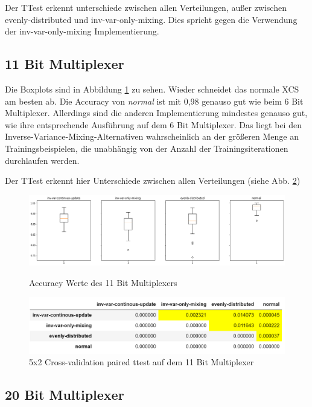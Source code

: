 \documentclass[10pt]{ocsmnar}
\begin{document}
Der TTest erkennt unterschiede zwischen allen Verteilungen, außer zwischen evenly-distributed und inv-var-only-mixing. Dies spricht gegen die Verwendung der inv-var-only-mixing Implementierung.

\subsection{11 Bit Multiplexer}

Die Boxplots sind in Abbildung \ref{boxplot-11-bit} zu sehen. Wieder schneidet das normale XCS am besten ab. Die Accuracy von \textit{normal} ist mit 0,98 genauso gut wie beim 6 Bit Multiplexer. Allerdings sind die anderen Implementierung mindestes genauso gut, wie ihre entsprechende Ausführung auf dem 6 Bit Multiplexer.  Das liegt bei den Inverse-Variance-Mixing-Alternativen wahrscheinlich an der größeren Menge an Trainingsbeispielen, die unabhängig von der Anzahl der Trainingsiterationen durchlaufen werden. 

Der TTest erkennt hier Unterschiede zwischen allen Verteilungen (siehe Abb. \ref{ttest-11-bit})

\begin{figure}[h]
    \includegraphics[width=\linewidth]{img/boxplot_11_bit.png}
    \caption{Accuracy Werte des 11 Bit Multiplexers}\label{boxplot-11-bit}
    \label{boxplot-11-bit}
\end{figure}

\begin{figure}[h]
    \includegraphics[width=\linewidth]{img/ttest_11_bit.png}
    \caption{5x2 Cross-validation paired ttest auf dem 11 Bit Multiplexer}\label{ttest-11-bit}
\end{figure}

\subsection{20 Bit Multiplexer}
\end{document}
